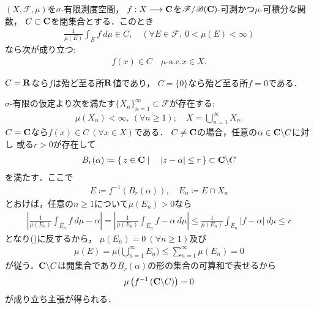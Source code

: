 	\begin{screen}
		\begin{thm}[写像の値域は積分の平均値の範囲を出ない]\label{thm:mean_value_of_integral_and_closed_set}
			$(X,\mathscr{F},\mu)$を$\sigma$-有限測度空間，
			$f:X \longrightarrow \mathbf{C}$を$\mathscr{F}/\mathscr{B}(\mathbf{C})$-可測かつ$\mu$-可積分な関数，
			$C \subset \mathbf{C}$を閉集合とする．このとき
			\begin{align}
				\frac{1}{\mu(E)}\int_E f\ d\mu \in C,
				\quad (\forall E \in \mathscr{F},\ 0 < \mu(E) < \infty)
				\label{eq:thm_mean_value_of_integral_and_closed_set}
			\end{align}
			なら次が成り立つ:
			\begin{align}
				f(x) \in C \quad \mbox{$\mu$-a.e.}x \in X.
			\end{align}
		\end{thm}
	\end{screen}
	$C=\mathbf{R}$なら$f$は殆ど至る所$\mathbf{R}$値であり，
	$C=\{0\}$なら殆ど至る所$f=0$である．
	\begin{prf}
		$\sigma$-有限の仮定より次を満たす$\{X_n\}_{n=1}^\infty \subset \mathscr{F}$が存在する:
		\begin{align}
			\mu(X_n) < \infty,\ (\forall n \geq 1);
			\quad X = \bigcup_{n=1}^\infty X_n.
		\end{align}
		$C = \mathbf{C}$なら$f(x) \in C\ (\forall x \in X)$である．
		$C \neq \mathbf{C}$の場合，任意の$\alpha \in \mathbf{C} \backslash C$に対し
		或る$r > 0$が存在して
		\begin{align}
			B_r(\alpha) \coloneqq \left\{\, z \in \mathbf{C} \mid \quad |z - \alpha| \leq r\, \right\} \subset \mathbf{C} \backslash C
		\end{align}
		を満たす．ここで
		\begin{align}
			E \coloneqq f^{-1}\left( B_r(\alpha) \right),
			\quad E_n \coloneqq E \cap X_n
		\end{align}
		とおけば，任意の$n \geq 1$について$\mu(E_n) > 0$なら
		\begin{align}
			\left| \frac{1}{\mu(E_n)}\int_{E_n} f\ d\mu - \alpha \right|
			= \left| \frac{1}{\mu(E_n)}\int_{E_n} f - \alpha\ d\mu \right|
			\leq \frac{1}{\mu(E_n)}\int_{E_n} |f - \alpha|\ d\mu
			\leq r
		\end{align}
		となり()に反するから，
		$\mu(E_n) = 0\ (\forall n \geq 1)$及び
		\begin{align}
			\mu(E) = \mu\Biggl( \bigcup_{n=1}^\infty E_n \Biggr) 
			\leq \sum_{n=1}^\infty \mu(E_n) = 0
		\end{align}
		が従う．$\mathbf{C} \backslash C$は開集合であり$B_r(\alpha)$の形の集合の可算和で表せるから
		\begin{align}
			\mu\left( f^{-1}\left( \mathbf{C} \backslash C \right) \right) = 0
		\end{align}
		が成り立ち主張が得られる．
		\QED
	\end{prf}
	
